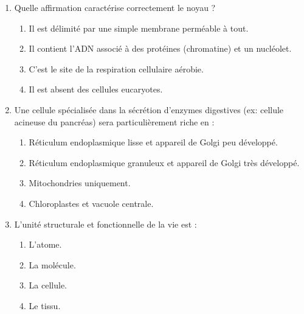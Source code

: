 \documentclass[11pt]{article}
\begin{document}
\begin{exercice}
\begin{enumerate}
    \item Quelle affirmation caractérise correctement le noyau ?
    \begin{enumerate}
        \item Il est délimité par une simple membrane perméable à tout.
        \item Il contient l'ADN associé à des protéines (chromatine) et un nucléolet.
        \item C'est le site de la respiration cellulaire aérobie.
        \item Il est absent des cellules eucaryotes.
    \end{enumerate}
    \item Une cellule spécialisée dans la sécrétion d'enzymes digestives (ex: cellule acineuse du pancréas) sera particulièrement riche en :
    \begin{enumerate}
        \item Réticulum endoplasmique lisse et appareil de Golgi peu développé.
        \item Réticulum endoplasmique granuleux et appareil de Golgi très développé.
        \item Mitochondries uniquement.
        \item Chloroplastes et vacuole centrale.
    \end{enumerate}
    \item L'unité structurale et fonctionnelle de la vie est :
    \begin{enumerate}
        \item L'atome.
        \item La molécule.
        \item La cellule.
        \item Le tissu.
    \end{enumerate}
\end{enumerate}
\end{exercice}
\end{document}
